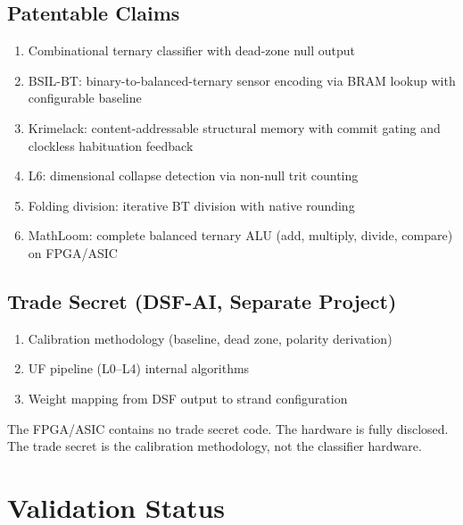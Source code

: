 \documentclass[11pt, a4paper]{article}
\begin{document}
\subsection{Patentable Claims}

\begin{enumerate}[nosep]
  \item Combinational ternary classifier with dead-zone null output
  \item BSIL-BT: binary-to-balanced-ternary sensor encoding via
        BRAM lookup with configurable baseline
  \item Krimelack: content-addressable structural memory with
        commit gating and clockless habituation feedback
  \item L6: dimensional collapse detection via non-null trit counting
  \item Folding division: iterative BT division with native rounding
  \item MathLoom: complete balanced ternary ALU (add, multiply,
        divide, compare) on FPGA/ASIC
\end{enumerate}

\subsection{Trade Secret (DSF-AI, Separate Project)}

\begin{enumerate}[nosep]
  \item Calibration methodology (baseline, dead zone, polarity derivation)
  \item UF pipeline (L0--L4) internal algorithms
  \item Weight mapping from DSF output to strand configuration
\end{enumerate}

The FPGA/ASIC contains no trade secret code. The hardware is
fully disclosed. The trade secret is the calibration methodology,
not the classifier hardware.

\section{Validation Status}
\end{document}
